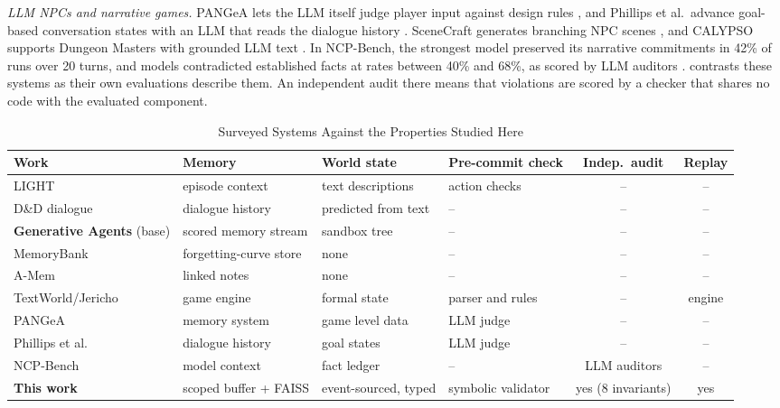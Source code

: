 \documentclass[letterpaper,journal]{IEEEtran}
\begin{document}
\emph{LLM NPCs and narrative games.} PANGeA lets the LLM itself judge player input against design rules \cite{buongiorno2024pangea}, and Phillips et al.\ advance goal-based conversation states with an LLM that reads the dialogue history \cite{phillips2025goal}. SceneCraft generates branching NPC scenes \cite{kumaran2023scenecraft}, and CALYPSO supports Dungeon Masters with grounded LLM text \cite{zhu2023calypso}. In NCP-Bench, the strongest model preserved its narrative commitments in 42\% of runs over 20 turns, and models contradicted established facts at rates between 40\% and 68\%, as scored by LLM auditors \cite{ma2026ncp}.  contrasts these systems as their own evaluations describe them. An independent audit there means that violations are scored by a checker that shares no code with the evaluated component.

\begin{table}[!btp]
\centering\footnotesize
\caption{Surveyed Systems Against the Properties Studied Here}
\label{tab:related}
\setlength{\tabcolsep}{4pt}
\begin{tabular}{@{}>{\raggedright\arraybackslash}p{3.7cm} >{\raggedright\arraybackslash}p{2.6cm} >{\raggedright\arraybackslash}p{2.4cm} l c c@{}}
\toprule
Work & Memory & World state & Pre-commit check & Indep.\ audit & Replay \\
\midrule
LIGHT \cite{urbanek2019light} & episode context & text descriptions & action checks & -- & -- \\
D\&D dialogue \cite{callisonburch2022dnd} & dialogue history & predicted from text & -- & -- & -- \\
\textbf{Generative Agents} \cite{park2023generative} (base) & scored memory stream & sandbox tree & -- & -- & -- \\
MemoryBank \cite{zhong2024memorybank} & forgetting-curve store & none & -- & -- & -- \\
A-Mem \cite{xu2025amem} & linked notes & none & -- & -- & -- \\
TextWorld/Jericho & game engine & formal state & parser and rules & -- & engine \\
PANGeA \cite{buongiorno2024pangea} & memory system & game level data & LLM judge & -- & -- \\
Phillips et al.\ \cite{phillips2025goal} & dialogue history & goal states & LLM judge & -- & -- \\
NCP-Bench \cite{ma2026ncp} & model context & fact ledger & -- & LLM auditors & -- \\
\textbf{This work} & scoped buffer + FAISS & event-sourced, typed & symbolic validator & yes (8 invariants) & yes \\
\bottomrule
\end{tabular}
\end{table}
\end{document}
